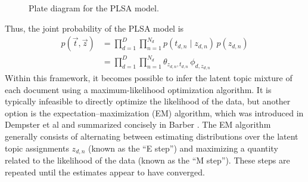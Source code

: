 \documentclass{article}
\begin{document}
\begin{figure}[htb]
%
\centering
{}
%
\caption{Plate diagram for the PLSA model.}
\label{fig:plate-plsa}
\end{figure}

Thus, the joint probability of the PLSA model is
\begin{align}
p(\vec{t}, \vec{z})
&= \prod_{d=1}^D \prod_{n=1}^{N_d} p(t_{d,n} \mid z_{d,n}) \, p(z_{d,n}) \\
&= \prod_{d=1}^D \prod_{n=1}^{N_d} \theta_{z_{d,n}, t_{d,n}} \, \phi_{d, z_{d,n}}
\end{align}
Within this framework, it becomes possible to infer the latent topic mixture of each document using a maximum-likelihood optimization algorithm.
It is typically infeasible to directly optimize the likelihood of the data, but another option is the expectation--maximization (EM) algorithm, which was introduced in Dempster et al \cite{dempster1977em} and summarized concisely in Barber \cite{barber2012bayesian}.
The EM algorithm generally consists of alternating between estimating distributions over the latent topic assignments $z_{d,n}$ (known as the ``E step'') and maximizing a quantity related to the likelihood of the data (known as the ``M step'').
These steps are repeated until the estimates appear to have converged.

\end{document}
